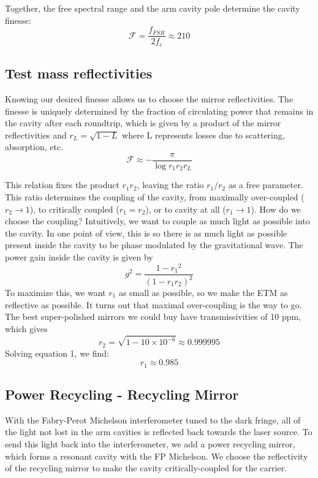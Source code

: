 Together, the free spectral range and the arm cavity pole determine
the cavity finesse:
\begin{equation}
\mathcal{F}=\frac{f_{FSR}}{2f_{c}}\approx210
\end{equation}

\subsection*{Test mass reflectivities}

Knowing our desired finesse allows us to choose the mirror reflectivities.
The finesse is uniquely determined by the fraction of circulating
power that remains in the cavity after each roundtrip, which is given
by a product of the mirror reflectivities and $r_{L}=\sqrt{1-L}$
where L represents losses due to scattering, absorption, etc. 
\begin{equation}
\mathcal{F}\approx-\frac{\pi}{\log r_{1}r_{2}r_{L}}
\end{equation}

This relation fixes the product $r_{1}r_{2}$, leaving the ratio $r_{1}/r_{2}$
as a free parameter. This ratio determines the coupling of the cavity,
from maximally over-coupled ($r_{2}\rightarrow1$), to critically
coupled ($r_{1}=r_{2}$), or to cavity at all ($r_{1}\rightarrow1$).
How do we choose the coupling? Intuitively, we want to couple as much
light as possible into the cavity. In one point of view, this is so
there is as much light as possible present inside the cavity to be
phase modulated by the gravitational wave. The power gain inside the
cavity is given by
\[
g^{2}=\frac{1-r_{1}{}^{2}}{\left(1-r_{1}r_{2}\right)^{2}}
\]
To maximize this, we want $r_{1}$ as small as possible, so we make
the ETM as reflective as possible. It turns out that maximal over-coupling
is the way to go. The best super-polished mirrors we could buy have
transmissivities of 10 ppm, which gives
\begin{equation}
r_{2}=\sqrt{{1-10\times10^{-6}}}\approx0.999995
\end{equation}
Solving equation 1, we find:
\begin{equation}
r_{1}\approx0.985
\end{equation}

\subsection*{Power Recycling - Recycling Mirror}

With the Fabry-Perot Michelson interferometer tuned to the dark fringe, all
of the light not lost in the arm cavities is reflected back towards
the laser source. To send this light back into the interferometer,
we add a power recycling mirror, which forms a resonant cavity with
the FP Michelson. We choose the reflectivity of the recycling mirror
to make the cavity critically-coupled for the carrier. 

